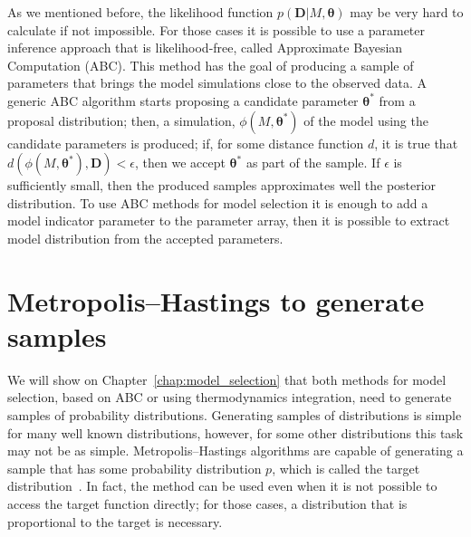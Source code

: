 As we mentioned before, the likelihood function 
$p({\bm D} | M, {\bm \theta})$ may be very hard to calculate if not 
impossible. For those cases it is possible to use a parameter inference
approach that is likelihood-free, called Approximate Bayesian 
Computation (ABC). This method has the goal of producing a sample of 
parameters that brings the model simulations close to the observed data.
A generic ABC algorithm starts proposing a candidate parameter 
${\bm \theta}^*$ from a proposal distribution; then, a simulation, 
$\phi (M, {\bm \theta}^*)$ of the model using the candidate parameters
is produced; if, for some distance function $d$, it is true that 
$d(\phi(M, {\bm \theta}^*), {\bm D}) < \epsilon$, then we accept 
${\bm \theta}^*$ as part of the sample. If $\epsilon$ is sufficiently 
small, then the produced samples approximates well the posterior 
distribution. To use ABC methods for model selection it is enough to add
a model indicator parameter to the parameter array, then it is possible
to extract model distribution from the accepted parameters.

\section{Metropolis--Hastings to generate samples}
We will show on Chapter~\ref{chap:model_selection} that both methods for
model selection, based on ABC or using thermodynamics
integration, need to generate samples of probability distributions. 
Generating samples of distributions is simple for many well known 
distributions, however, for some other distributions this task may not 
be as simple. Metropolis--Hastings algorithms are capable of generating a 
sample that has some probability distribution $p$, which is called the 
target distribution~\cite{Chib1995}. In fact, the method can be used
even when it is not possible to access the target function directly; for
those cases, a  distribution that is proportional to the target is
necessary.

